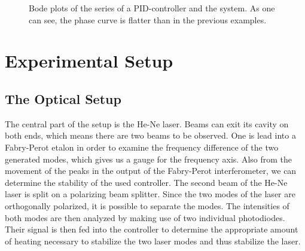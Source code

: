 \documentclass[a4paper,10pt]{article}
\begin{document}
\begin{figure}[htp!]
\caption{Bode plots of the series of a PID-controller and the system. As one can see, the phase curve is flatter than in the previous examples. }
\label{fig_bode_pid}
\end{figure}

\section{Experimental Setup}
\subsection{The Optical Setup}
The central part of the setup is the He-Ne laser. Beams can exit its cavity on both ends, which means there are two beams to be observed. One is lead into a Fabry-Perot etalon in order to examine the frequency difference of the two generated modes, which gives us a gauge for the frequency axis. Also from the movement of the peaks in the output of the Fabry-Perot interferometer, we can determine the stability of the used controller.
\newline
The second beam of the He-Ne laser is split on a polarizing beam splitter. Since the two modes of the laser are orthogonally polarized, it is possible to separate the modes. The intensities of both modes are then analyzed by making use of two individual photodiodes. Their signal is then fed into the controller to determine the appropriate amount of heating necessary to stabilize the two laser modes and thus stabilize the laser.
\end{document}

